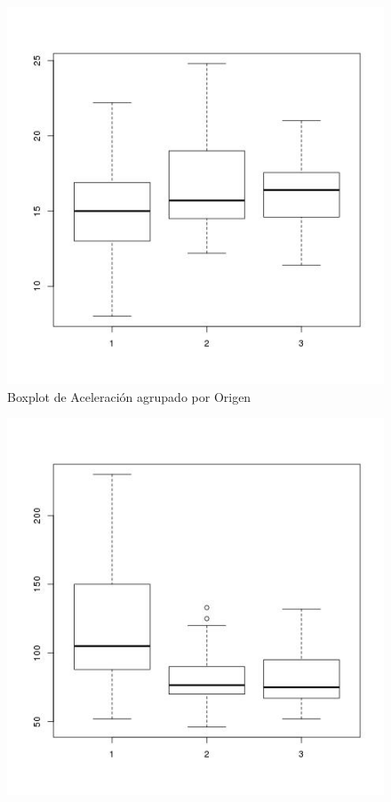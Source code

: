 \documentclass[letter,10pt]{article}
\begin{document}
  \begin{minipage}{\linewidth}
      \centering
      \begin{minipage}{0.45\linewidth}
          \begin{figure}[H]
              \includegraphics[width=\linewidth]{boxplot_acceleration_origin.jpg}
              \caption{Boxplot de Aceleración agrupado por Origen}
          \end{figure}
      \end{minipage}
      \hspace{0.05\linewidth}
      \begin{minipage}{0.45\linewidth}
          \begin{figure}[H]
              \includegraphics[width=\linewidth]{boxplot_horsepower_origin.jpg}

\end{figure}
\end{minipage}
\end{minipage}
\end{document}
